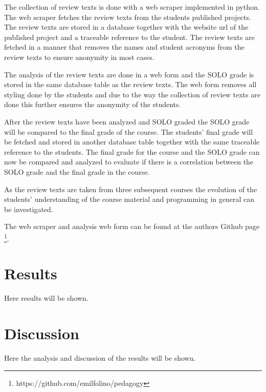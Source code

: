 \documentclass[twoside,twocolumn,a4paper,11pt,english]{article}
\begin{document}
The collection of review texts is done with a web scraper implemented in python. The web scraper fetches the review texts from the students published projects. The review texts are stored in a database together with the website url of the published project and a traceable reference to the student. The review texts are fetched in a manner that removes the names and student acronyms from the review texts to ensure anonymity in most cases.

The analysis of the review texts are done in a web form and the SOLO grade is stored in the same database table as the review texts. The web form removes all styling done by the students and due to the way the collection of review texts are done this further ensures the anonymity of the students.

After the review texts have been analyzed and SOLO graded the SOLO grade will be compared to the final grade of the course. The students' final grade will be fetched and stored in another database table together with the same traceable reference to the students. The final grade for the course and the SOLO grade can now be compared and analyzed to evaluate if there is a correlation between the SOLO grade and the final grade in the course.

As the review texts are taken from three subsequent courses the evolution of the students' understanding of the course material and programming in general can be investigated.

The web scraper and analysis web form can be found at the authors Github page \footnote{https://github.com/emilfolino/pedagogy}.




\section{Results}

Here results will be shown.




\section{Discussion}

Here the analysis and discussion of the results will be shown.
\end{document}

